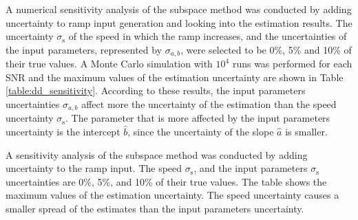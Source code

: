 {{A numerical sensitivity analysis of the subspace method was conducted by adding uncertainty to ramp input generation and looking into the estimation results. 
The uncertainty $\sigma_{\mathrm{s}}$ of the speed in which the ramp increases, and the uncertainties of the input parameters, represented by $\sigma_{a,b}$, were selected to be 0\%, 5\% and 10\% of their true values.
A Monte Carlo simulation with $10^4$ runs was performed for each SNR and the maximum values of the estimation uncertainty are shown in Table \ref{table:dd_sensitivity}. 
According to these results, the input parameters uncertainties $\sigma_{a,b}$ affect more the uncertainty of the estimation than the speed uncertainty $\sigma_{\mathrm{s}}$. 
The parameter that is more affected by the input parameters uncertainty is the intercept $\widehat{b}$, since the uncertainty of the slope $\widehat{a}$ is smaller.


\begin{table}[h!]
\centering
\caption{ A sensitivity analysis of the subspace method was conducted by adding uncertainty to the ramp input. The speed $\sigma_{\mathrm{s}}$, and the input parameters $\sigma_{\mathrm{s}}$ uncertainties are 0\%, 5\%, and 10\% of their true values. The table shows the maximum values of the estimation uncertainty. The speed uncertainty causes a smaller spread of the estimates than the input parameters uncertainty.}
 

\end{table}}}
